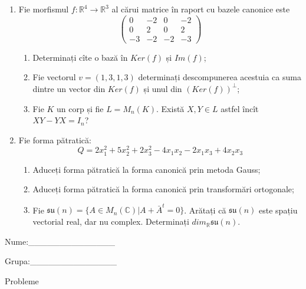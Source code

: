 \documentclass{article}
\begin{document}
\begin{enumerate}
 \item Fie morfismul $f:\mathbb{R}^4 \to \mathbb{R}^3$ al cărui matrice în raport cu bazele canonice este
$$\begin{pmatrix}
0&-2&0&-2\\
0&2&0&2\\
-3&-2&-2&-3
\end{pmatrix}$$

\begin{enumerate}
\item Determinați cîte o bază în $Ker(f)$ și $Im(f)$;
\item Fie vectorul $v=(1,3,1,3)$ determinați descompunerea acestuia ca suma dintre un vector din $Ker(f)$ și unul din $(Ker(f))^\perp$;
\item Fie $K$ un corp și fie $L=M_n(K)$. Există $X,Y \in L$ astfel încît $XY-YX=I_n$?  
\end{enumerate}
\item Fie forma pătratică:
$$Q= 2x_1^2+5x_2^2+2x_3^2-4x_1x_2-2x_1x_3+4x_2x_3$$

\begin{enumerate}
\item Aduceți forma pătratică la forma canonică prin metoda Gauss;
\item Aduceți forma pătratică la forma canonică prin transformări ortogonale;
\item Fie $\mathfrak{su}(n)=\{ A \in M_n(\mathbb{C}) | A+\bar{A}^t=0\}$. Arătați că $\mathfrak{su}(n)$ este spațiu vectorial real, dar nu complex.
Determinați $dim_{\mathbb{R}}\mathfrak{su}(n)$.
\end{enumerate}
\end{enumerate}
\newpage
\begin{flushright}
Nume:\_\_\_\_\_\_\_\_\_\_\_\_\_\_
 
 
Grupa:\_\_\_\_\_\_\_\_\_\_\_\_\_\_
\end{flushright}
\begin{center}
\vspace{2cm}
{\Large Probleme}
\vspace{2cm}
\end{center}
\end{document}

